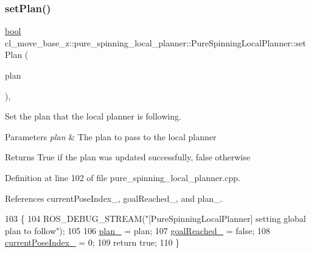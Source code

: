 \mbox{\label{classcl__move__base__z_1_1pure__spinning__local__planner_1_1PureSpinningLocalPlanner_a86a2249c0132ae9f0dc666a67d5a1f9b}} 
\subsubsection{\texorpdfstring{set\+Plan()}{setPlan()}}
{\footnotesize\ttfamily \hyperlink{classbool}{bool} cl\+\_\+move\+\_\+base\+\_\+z\+::pure\+\_\+spinning\+\_\+local\+\_\+planner\+::\+Pure\+Spinning\+Local\+Planner\+::set\+Plan (\begin{DoxyParamCaption}\item[{const std\+::vector$<$ geometry\+\_\+msgs\+::\+Pose\+Stamped $>$ \&}]{plan }\end{DoxyParamCaption})\hspace{0.3cm}{\ttfamily [override]}, {\ttfamily [virtual]}}



Set the plan that the local planner is following. 


\begin{DoxyParams}{Parameters}
{\em plan} & The plan to pass to the local planner \\
\hline
\end{DoxyParams}
\begin{DoxyReturn}{Returns}
True if the plan was updated successfully, false otherwise 
\end{DoxyReturn}


Definition at line 102 of file pure\+\_\+spinning\+\_\+local\+\_\+planner.\+cpp.



References current\+Pose\+Index\+\_\+, goal\+Reached\+\_\+, and plan\+\_\+.


\begin{DoxyCode}
103 \{
104   ROS\_DEBUG\_STREAM(\textcolor{stringliteral}{"[PureSpinningLocalPlanner] setting global plan to follow"});
105 
106   \hyperlink{classcl__move__base__z_1_1pure__spinning__local__planner_1_1PureSpinningLocalPlanner_a31875ee78bae4698b579e20c0754860d}{plan\_} = plan;
107   \hyperlink{classcl__move__base__z_1_1pure__spinning__local__planner_1_1PureSpinningLocalPlanner_aecfe0dfc68b8c8e461e8b684e5fa4d2f}{goalReached\_} = \textcolor{keyword}{false};
108   \hyperlink{classcl__move__base__z_1_1pure__spinning__local__planner_1_1PureSpinningLocalPlanner_aa0f9b4cf52a76e44dc2cfc5103d52dcd}{currentPoseIndex\_} = 0;
109   \textcolor{keywordflow}{return} \textcolor{keyword}{true};
110 \}
\end{DoxyCode}



